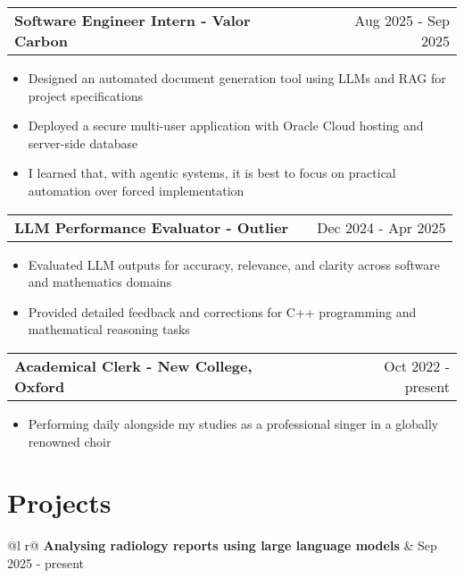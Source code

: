\documentclass[a4paper,10pt]{article}
\makeatletter
\newenvironment{joblong}[2]
    {
    \begin{tabularx}{\linewidth}{@{}l X r@{}}
    \textbf{#1} & \hfill &  #2 \\[2pt]
    \end{tabularx}
    \begin{minipage}[t]{\linewidth}
    \begin{itemize}[nosep,after=\strut, leftmargin=1em, itemsep=1pt,label=--]
    }
    {
    \end{itemize}
    \end{minipage}    
    }
\makeatother
\begin{document}
\vspace{1pt}

\begin{joblong}{Software Engineer Intern - Valor Carbon}{Aug 2025 - Sep 2025}
\item Designed an automated document generation tool using LLMs and RAG for project specifications
\item Deployed a secure multi-user application with Oracle Cloud hosting and server-side database
\item I learned that, with agentic systems, it is best to focus on practical automation over forced implementation
\end{joblong}

\vspace{1pt}

\begin{joblong}{LLM Performance Evaluator - Outlier}{Dec 2024 - Apr 2025}
\item Evaluated LLM outputs for accuracy, relevance, and clarity across software and mathematics domains
\item Provided detailed feedback and corrections for C++ programming and mathematical reasoning tasks
\end{joblong}

\vspace{1pt}

\begin{joblong}{Academical Clerk - New College, Oxford}{Oct 2022 - present}
\item Performing daily alongside my studies as a professional singer in a globally renowned choir
\end{joblong}

\section{Projects}

\begin{tabularx}{\linewidth}{ @{}l r@{} }
\textbf{Analysing radiology reports using large language models} & \hfill Sep 2025 - present \\[2pt]
  \\
\end{tabularx}
\end{document}
